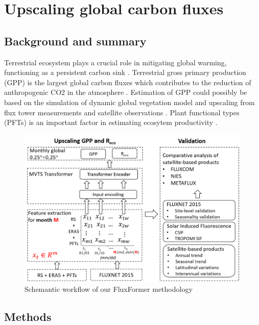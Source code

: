 \chapter{Upscaling global carbon fluxes}
\renewcommand{\headrulewidth}{0pt}
\lhead[\thepage]{\leftmark}
\rhead[\leftmark]{\thepage}
\cfoot[]{}

\section{Background and summary}
Terrestrial ecosystem plays a crucial role in mitigating global warming, functioning as a persistent carbon sink \citep{pan2011large}. Terrestrial gross primary production (GPP) is the largest global carbon fluxes which contributes to the reduction of anthropogenic CO2 in the atmosphere \citep{beer2010terrestrial}. Estimation of GPP could possibly be based on the simulation of dynamic global vegetation model \citep{sitch2015recent, le2018global} and upscaling from flux tower measurements and satellite observations \citep{jung2019fluxcom,zeng2020global}.
Plant functional types (PFTs) is an important factor in estimating ecosytem productivity \citep{lin2021improved, guo2023estimating, yan2023integrating}. 
\begin{figure}[tbh!]
    \centering
    \includegraphics[width=\textwidth]{figs/chap6/workflow.png}
    \caption[Schemantic workflow of our FluxFormer methodology]{Schemantic workflow of our FluxFormer methodology}
    \label{fig:chap6_fig1}
\end{figure}

\section{Methods}
